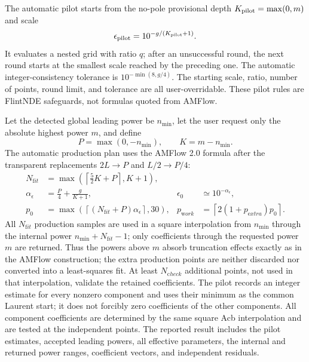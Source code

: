 \documentclass[11pt]{article}
\newcommand{\eps}{\epsilon}
\begin{document}
The automatic pilot starts from the no-pole provisional depth
$K_{\rm pilot}=\max(0,m)$ and scale
\begin{equation}
 \eps_{\rm pilot}=10^{-g/(K_{\rm pilot}+1)}.
\end{equation}
It evaluates a nested grid with ratio $q$; after an unsuccessful round, the next round starts
at the smallest scale reached by the preceding one.  The automatic integer-consistency
tolerance is $10^{-\min(8,g/4)}$.  The starting scale, ratio, number of points, round limit,
and tolerance are all user-overridable.  These pilot rules are FlintNDE safeguards, not
formulas quoted from AMFlow.

Let the detected global leading power be $n_{\min}$, let the user request only the absolute
highest power $m$, and define
\begin{equation}
  P=\max(0,-n_{\min}),\qquad K=m-n_{\min}.
\end{equation}
The automatic production plan uses the AMFlow 2.0 formula after the transparent replacements
$2L\to P$ and $L/2\to P/4$:
\begin{align}
 N_{\mathrm fit}&=
 \max\!\left(\left\lceil\frac52K+P\right\rceil,K+1\right),\\
 \alpha_\eps&=\frac P4+\frac{g}{K+1},
 &\eps_0&\simeq10^{-\alpha_\eps},\\
 p_0&=\max\left(\left\lceil(N_{\mathrm fit}+P)\alpha_\eps\right\rceil,30\right),
 &p_{\mathrm work}&=\left\lceil2(1+p_{\mathrm extra})p_0\right\rceil.
  \label{eq:ndes-series-reconstruction-default}
\end{align}
All $N_{\mathrm fit}$ production samples are used in a square interpolation from
$n_{\min}$ through the internal power
$n_{\min}+N_{\mathrm fit}-1$; only coefficients through the requested power $m$ are returned.
Thus the powers above $m$ absorb truncation effects exactly as in the AMFlow construction;
the extra production points are neither discarded nor converted into a least-squares fit.
At least $N_{\mathrm check}$ additional points, not used in that interpolation, validate the
retained coefficients.  The pilot records an integer estimate for every nonzero component and
uses their minimum as the common Laurent start; it does not forcibly zero coefficients of the
other components.  All component coefficients are determined by the same square Acb
interpolation and are tested at the independent points.  The reported result includes the
pilot estimates, accepted leading powers, all effective parameters, the internal and returned
power ranges, coefficient vectors, and independent residuals.
\end{document}
